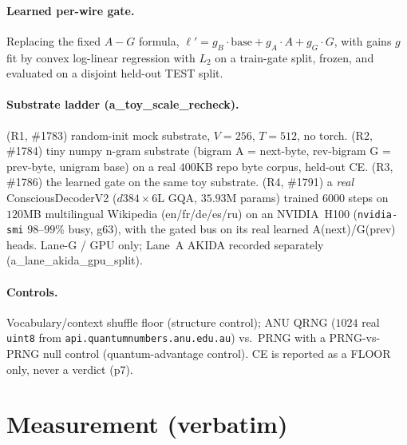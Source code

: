 \documentclass[11pt]{article}
\begin{document}
\paragraph{Learned per-wire gate.} Replacing the fixed $A{-}G$ formula,
$\ell' = g_B\!\cdot\!\text{base} + g_A\!\cdot\!A + g_G\!\cdot\!G$, with gains $g$ fit by
convex log-linear regression with $L_2$ on a train-gate split, frozen, and evaluated on a
disjoint held-out TEST split.

\paragraph{Substrate ladder (a\_toy\_scale\_recheck).}
(R1, \#1783) random-init mock substrate, $V{=}256$, $T{=}512$, no torch.
(R2, \#1784) tiny numpy n-gram substrate (bigram A = next-byte, rev-bigram G = prev-byte,
unigram base) on a real $400$KB repo byte corpus, held-out CE.
(R3, \#1786) the learned gate on the same toy substrate.
(R4, \#1791) a \emph{real} ConsciousDecoderV2 ($d384\times6$L GQA, $35.93$M params) trained
$6000$ steps on $120$MB multilingual Wikipedia (en/fr/de/es/ru) on an NVIDIA~H100
(\texttt{nvidia-smi} $98$--$99\%$ busy, g63), with the gated bus on its real learned A(next)/G(prev)
heads. Lane-G / GPU only; Lane~A AKIDA recorded separately (a\_lane\_akida\_gpu\_split).

\paragraph{Controls.} Vocabulary/context shuffle floor (structure control); ANU QRNG
($1024$ real \texttt{uint8} from \texttt{api.quantumnumbers.anu.edu.au}) vs.\ PRNG with a
PRNG-vs-PRNG null control (quantum-advantage control). CE is reported as a FLOOR only, never a
verdict (p7).

\section{Measurement (verbatim)}
\label{sec:measurement}
\end{document}

